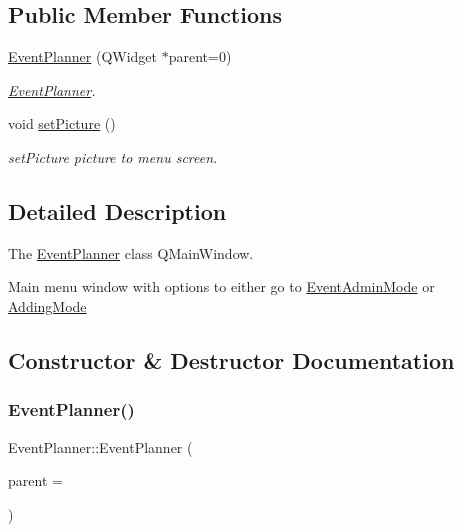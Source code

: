 \subsection*{Public Member Functions}
\begin{DoxyCompactItemize}
\item 
\hyperlink{class_event_planner_ae8b0e5c382c777476a003e3c099d5e38}{Event\+Planner} (Q\+Widget $\ast$parent=0)
\begin{DoxyCompactList}\small\item\em \hyperlink{class_event_planner}{Event\+Planner}. \end{DoxyCompactList}\item 
\mbox{\label{class_event_planner_a2453c0478a2c0f60575e553dbea57f1e}} 
void \hyperlink{class_event_planner_a2453c0478a2c0f60575e553dbea57f1e}{set\+Picture} ()
\begin{DoxyCompactList}\small\item\em set\+Picture  picture to menu screen. \end{DoxyCompactList}\end{DoxyCompactItemize}


\subsection{Detailed Description}
The \hyperlink{class_event_planner}{Event\+Planner} class  Q\+Main\+Window. 

Main menu window with options to either go to \hyperlink{class_event_admin_mode}{Event\+Admin\+Mode} or \hyperlink{class_adding_mode}{Adding\+Mode} 

\subsection{Constructor \& Destructor Documentation}
\mbox{\label{class_event_planner_ae8b0e5c382c777476a003e3c099d5e38}} 
\subsubsection{\texorpdfstring{Event\+Planner()}{EventPlanner()}}
{\footnotesize\ttfamily Event\+Planner\+::\+Event\+Planner (\begin{DoxyParamCaption}\item[{Q\+Widget $\ast$}]{parent = {} }\end{DoxyParamCaption})\hspace{0.3cm}{\ttfamily [explicit]}}



